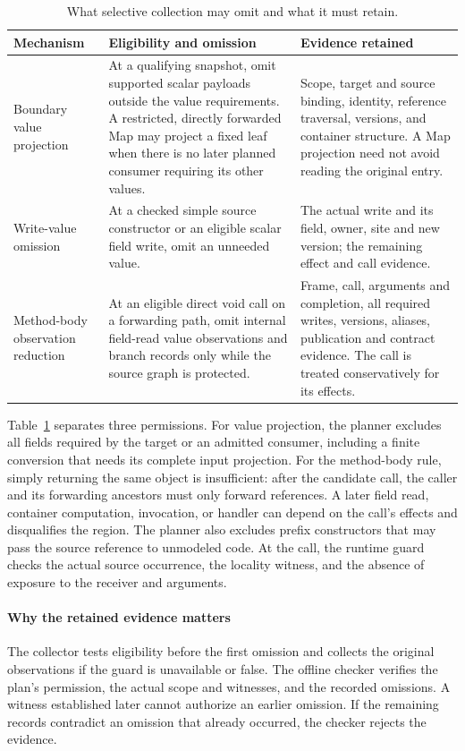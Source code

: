 \begin{table}[t]
\centering
\caption{What selective collection may omit and what it must retain.}
\label{tab:observation-policy}
\footnotesize
\begin{tabularx}{\textwidth}{@{}>{\raggedright\arraybackslash}p{}XX@{}}
\toprule
Mechanism & Eligibility and omission & Evidence retained \\
\midrule
Boundary value projection &
At a qualifying snapshot, omit supported scalar payloads outside the
value requirements. A restricted, directly forwarded Map may project
a fixed leaf when there is no later planned consumer requiring its
other values. &
Scope, target and source binding, identity, reference traversal,
versions, and container structure. A Map projection need not avoid
reading the original entry. \\
Write-value omission &
At a checked simple source constructor or an eligible scalar field
write, omit an unneeded value. &
The actual write and its field, owner, site and new version; the
remaining effect and call evidence. \\
Method-body observation reduction &
At an eligible direct void call on a forwarding path, omit internal
field-read value observations and branch records only while the
source graph is protected. &
Frame, call, arguments and completion, all required writes,
versions, aliases, publication and contract evidence. The call
is treated conservatively for its effects. \\
\bottomrule
\end{tabularx}
\end{table}

Table~\ref{tab:observation-policy} separates three permissions. For
value projection, the planner excludes all fields required by the target
or an admitted consumer, including a finite conversion that needs its
complete input projection. For the method-body rule, simply returning
the same object is insufficient: after the candidate call, the caller
and its forwarding ancestors must only forward references. A later
field read, container computation, invocation, or handler can depend on
the call's effects and disqualifies the region. The planner also excludes
prefix constructors that may pass the source reference to unmodeled code.
At the call, the runtime guard checks the actual source occurrence, the
locality witness, and the absence of exposure to the receiver and
arguments.

\paragraph{Why the retained evidence matters}
The collector tests eligibility before the first omission and collects
the original observations if the guard is unavailable or false.
The offline checker verifies the plan's permission, the actual scope and
witnesses, and the recorded omissions. A witness established later cannot
authorize an earlier omission. If the remaining records contradict an
omission that already occurred, the checker rejects the evidence.

